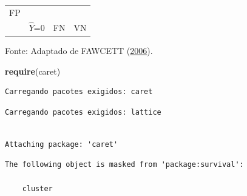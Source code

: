 \documentclass[12pt,brazil,oneside]{book}
\newenvironment{Shaded}{\begin{snugshade}}{\end{snugshade}}
\newcommand{\DataTypeTok}[1]{\textcolor[rgb]{0.13,0.29,0.53}{#1}}
\newcommand{\FloatTok}[1]{\textcolor[rgb]{0.00,0.00,0.81}{#1}}
\newcommand{\KeywordTok}[1]{\textcolor[rgb]{0.13,0.29,0.53}{\textbf{#1}}}
\newcommand{\NormalTok}[1]{#1}
\newcommand{\OperatorTok}[1]{\textcolor[rgb]{0.81,0.36,0.00}{\textbf{#1}}}
\newcommand{\StringTok}[1]{\textcolor[rgb]{0.31,0.60,0.02}{#1}}
\begin{document}
\begin{longtable}[]{@{}llll@{}}
\begin{minipage}[t]{0.14\columnwidth}
FP\strut
\end{minipage}\tabularnewline
\begin{minipage}[t]{0.25\columnwidth}\raggedright
\strut
\end{minipage} & \begin{minipage}[t]{0.15\columnwidth}\raggedright
\(\hat Y\)=0\strut
\end{minipage} & \begin{minipage}[t]{0.25\columnwidth}\raggedright
FN\strut
\end{minipage} & \begin{minipage}[t]{0.14\columnwidth}\raggedright
VN\strut
\end{minipage}\tabularnewline
\bottomrule
\end{longtable}

Fonte: Adaptado de FAWCETT (\protect\hyperlink{ref-Fawcett2006}{2006}).

\begin{Shaded}
\begin{Highlighting}[]
\KeywordTok{require}\NormalTok{(caret)}
\end{Highlighting}
\end{Shaded}

\begin{verbatim}
Carregando pacotes exigidos: caret
\end{verbatim}

\begin{verbatim}
Carregando pacotes exigidos: lattice
\end{verbatim}

\begin{verbatim}

Attaching package: 'caret'
\end{verbatim}

\begin{verbatim}
The following object is masked from 'package:survival':

    cluster
\end{verbatim}

\begin{Shaded}
\end{Shaded}
\end{document}
